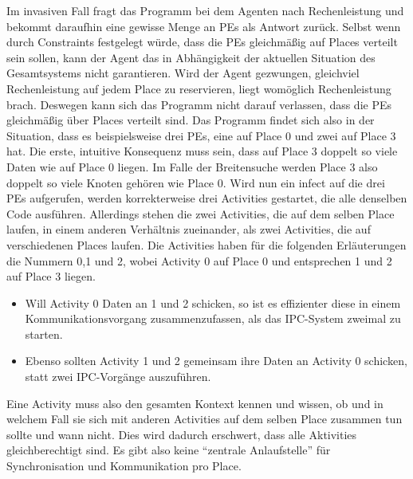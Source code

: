 Im invasiven Fall fragt das Programm bei dem Agenten nach Rechenleistung und bekommt daraufhin eine gewisse Menge an PEs als Antwort zurück. Selbst wenn durch Constraints festgelegt würde, dass die PEs gleichmäßig auf Places verteilt sein sollen, kann der Agent das in Abhängigkeit der aktuellen Situation des Gesamtsystems nicht garantieren. Wird der Agent gezwungen, gleichviel Rechenleistung auf jedem Place zu reservieren, liegt womöglich Rechenleistung brach. Deswegen kann sich das Programm nicht darauf verlassen, dass die PEs gleichmäßig über Places verteilt sind. Das Programm findet sich also in der Situation, dass es beispielsweise drei PEs, eine auf Place 0 und zwei auf Place 3 hat. Die erste, intuitive Konsequenz muss sein, dass auf Place 3 doppelt so viele Daten wie auf Place 0 liegen. Im Falle der Breitensuche werden Place 3 also doppelt so viele Knoten gehören wie Place 0. Wird nun ein infect auf die drei PEs aufgerufen, werden korrekterweise drei Activities gestartet, die alle denselben Code ausführen. Allerdings stehen die zwei Activities, die auf dem selben Place laufen, in einem anderen Verhältnis zueinander, als zwei Activities, die auf verschiedenen Places laufen. Die Activities haben für die folgenden Erläuterungen die Nummern 0,1 und 2, wobei Activity 0 auf Place 0 und entsprechen 1 und 2 auf Place 3 liegen.
\begin{itemize}
	\item Will Activity 0 Daten an 1 und 2 schicken, so ist es effizienter diese in einem Kommunikationsvorgang zusammenzufassen, als das IPC-System zweimal zu starten.
	\item Ebenso sollten Activity 1 und 2 gemeinsam ihre Daten an Activity 0 schicken, statt zwei IPC-Vorgänge auszuführen.
\end{itemize}
Eine Activity muss also den gesamten Kontext kennen und wissen, ob und in welchem Fall sie sich mit anderen Activities auf dem selben Place zusammen tun sollte und wann nicht. Dies wird dadurch erschwert, dass alle Aktivities gleichberechtigt sind. Es gibt also keine \enquote{zentrale Anlaufstelle} für Synchronisation und Kommunikation pro Place.

